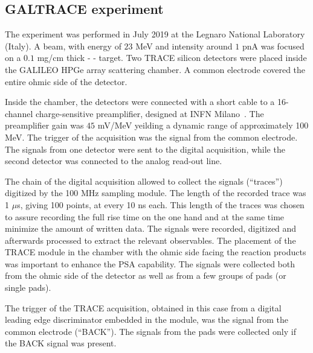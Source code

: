 \subsection{GALTRACE experiment}

The experiment was performed in July 2019 at the Legnaro National Laboratory
(Italy). A  beam, with energy of $23$ MeV and intensity around $1$ pnA
was focused on a $0.1$ mg/cm thick  - - target.
Two TRACE silicon detectors were placed inside the GALILEO HPGe array
scattering chamber. A common electrode covered the entire ohmic side of the
detector.

\bigbreak

Inside the chamber, the detectors were connected with a short cable to a
16-channel charge-sensitive preamplifier, designed at INFN Milano~\cite{strano}.
The preamplifier gain was $45$ mV/MeV yeilding a dynamic range of
approximately 100 MeV. The trigger of the acquisition was the signal from the
common electrode. The signals from one detector were sent to the digital
acquisition, while the second detector was connected to the analog read-out
line.

\bigbreak

The chain of the digital acquisition allowed to collect the signals (“traces”)
digitized by the 100 MHz sampling module. The length of the recorded trace was
1 $\mu$s, giving 100 points, at every 10 ns each. This length of the traces
was chosen to assure recording the full rise time on the one hand and at the
same time minimize the amount of written data. The signals were recorded,
digitized and afterwards processed to extract the relevant observables. The
placement of the TRACE module in the chamber with the ohmic side facing the
reaction products was important to enhance the PSA capability. The signals
were collected both from the ohmic side of the detector as well as from a few
groups of pads (or single pads).

\bigbreak

The trigger of the TRACE acquisition, obtained in this case from a digital
leading edge discriminator embedded in the module, was the signal from the
common electrode (“BACK”). The signals from the pads were collected only if
the BACK signal was present.